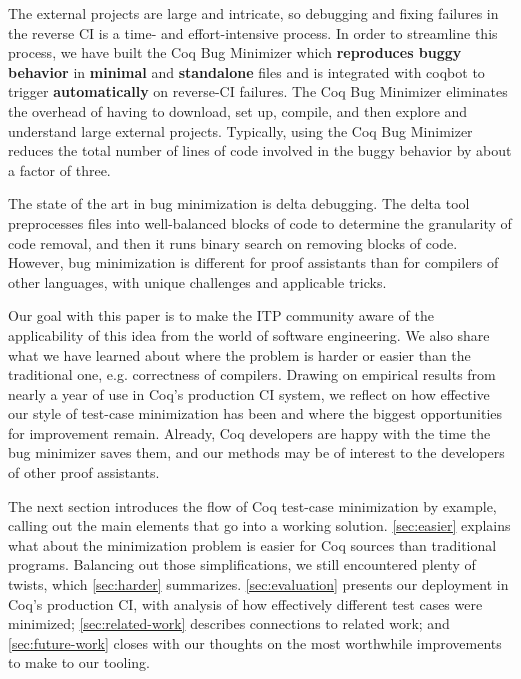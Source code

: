\documentclass[a4paper,USenglish,cleveref,autoref,thm-restate]{lipics-v2021}
\begin{document}
The external projects are large and intricate, so debugging and fixing failures in the reverse CI is a time- and effort-intensive process.
In order to streamline this process, we have built the Coq Bug Minimizer which \textbf{reproduces buggy behavior} in \textbf{minimal} and \textbf{standalone} files and is integrated with coqbot to trigger \textbf{automatically} on reverse-CI failures.
The Coq Bug Minimizer eliminates the overhead of having to download, set up, compile, and then explore and understand large external projects.
Typically, using the Coq Bug Minimizer reduces the total number of lines of code involved in the buggy behavior by about a factor of three.


The state of the art in bug minimization is delta debugging.
The delta tool~\cite{delta} preprocesses files into well-balanced blocks of code to determine the granularity of code removal, and then it runs binary search on removing blocks of code.
However, bug minimization is different for proof assistants than for compilers of other languages, with unique challenges and applicable tricks.

Our goal with this paper is to make the ITP community aware of the applicability of this idea from the world of software engineering.
We also share what we have learned about where the problem is harder or easier than the traditional one, e.g. correctness of compilers.
Drawing on empirical results from nearly a year of use in Coq's production CI system, we reflect on how effective our style of test-case minimization has been and where the biggest opportunities for improvement remain.
Already, Coq developers are happy with the time the bug minimizer saves them, and our methods may be of interest to the developers of other proof assistants.

The next section introduces the flow of Coq test-case minimization by example, calling out the main elements that go into a working solution.
\autoref{sec:easier} explains what about the minimization problem is easier for Coq sources than traditional programs.
Balancing out those simplifications, we still encountered plenty of twists, which \autoref{sec:harder} summarizes.
\autoref{sec:evaluation} presents our deployment in Coq's production CI, with analysis of how effectively different test cases were minimized; \autoref{sec:related-work} describes connections to related work; and \autoref{sec:future-work} closes with our thoughts on the most worthwhile improvements to make to our tooling.
\end{document}
